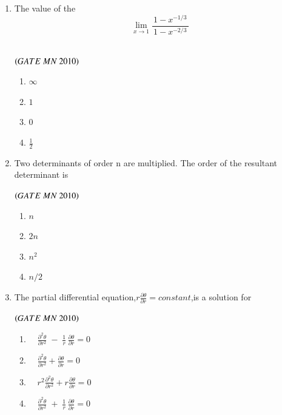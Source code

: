 \documentclass{article}
\begin{document}
\begin{enumerate}[label=Q.\arabic*., itemsep=1em, leftmargin=0pt, itemindent=*, labelsep=0.5em]
\bigskip
\item The value of the\[\lim_{x \to 1} \frac{\,1 - x^{-1/3}\,}{\,1 - x^{-2/3}\,}\]
\\
\begin{flushright}
\hfill$\left(GATE\ MN\ 2010\right)$
\end{flushright}
\begin{multicols}{2}
\begin{enumerate}[label=(\Alph*),leftmargin=4em]
\item $\infty$
\item $1$
\item $0$
\item $\frac{1}{2}$
\end{enumerate}
\end{multicols}
\bigskip
\item Two determinants of order n are multiplied. The 
order of the resultant determinant is
\\
\begin{flushright}
\hfill$\left(GATE\ MN\ 2010\right)$
\end{flushright}
\begin{multicols}{4}
\begin{enumerate}[label=(\Alph*),leftmargin=4em]
\item $n$
\item $2n$
\item $n^2$
\item $n/2$
\end{enumerate}
\end{multicols}
\bigskip
\item The partial differential equation,$r\frac{\partial \theta}{\partial r}=constant$,is a solution for
\\
\begin{flushright}
\hfill$\left(GATE\ MN\ 2010\right)$
\end{flushright}
\begin{multicols}{2}
\begin{enumerate}[label=(\Alph*),leftmargin=4em]
\item $\quad \frac{\partial^2 \theta}{\partial r^2} \;-\; \frac{1}{r}\,\frac{\partial \theta}{\partial r} = 0$
\item $\quad \frac{\partial^2 \theta}{\partial r^2} + \frac{\partial \theta}{\partial r} = 0$
\item $\quad r^2 \frac{\partial^2 \theta}{\partial r^2}
         + r \frac{\partial \theta}{\partial r} = 0$
\item $\quad \frac{\partial^2 \theta}{\partial r^2} \;+\; \frac{1}{r}\,\frac{\partial \theta}{\partial r} = 0$
\end{enumerate}
\end{multicols}


\end{enumerate}
\end{document}
